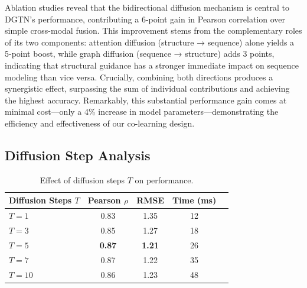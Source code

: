 \documentclass[11pt]{article}
\begin{document}
% 
% 

Ablation studies reveal that the bidirectional diffusion mechanism is central
to DGTN’s performance, contributing a 6-point gain in Pearson correlation over
simple cross-modal fusion. This improvement stems from the complementary roles
of its two components: attention diffusion (structure → sequence) alone yields
a 5-point boost, while graph diffusion (sequence → structure) adds 3 points,
indicating that structural guidance has a stronger immediate impact on sequence
modeling than vice versa. Crucially, combining both directions produces a
synergistic effect, surpassing the sum of individual contributions and
achieving the highest accuracy. Remarkably, this substantial performance gain
comes at minimal cost—only a 4\% increase in model parameters—demonstrating the
efficiency and effectiveness of our co-learning design.




\subsection{Diffusion Step Analysis}

\begin{table}[htbp]
\centering
\caption{Effect of diffusion steps $T$ on performance.}
\label{tab:diffusion_steps}
\begin{tabular}{lcccc}
\toprule
\textbf{Diffusion Steps} $T$ & \textbf{Pearson} $\rho$ & \textbf{RMSE} & \textbf{Time (ms)} \\
\midrule
$T=1$ & 0.83 & 1.35 & 12 \\
$T=3$ & 0.85 & 1.27 & 18 \\
$T=5$ & \textbf{0.87} & \textbf{1.21} & 26 \\
$T=7$ & 0.87 & 1.22 & 35 \\
$T=10$ & 0.86 & 1.23 & 48 \\
\bottomrule
\end{tabular}
\end{table}
\end{document}
